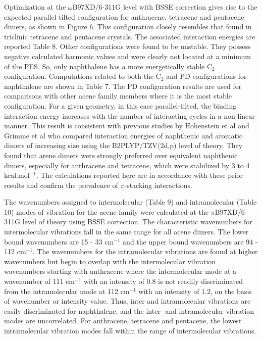 Optimization at the $\omega$B97XD/6-311G level with BSSE correction gives rise to the expected parallel tilted configuration \cite{brock1990temperature} for anthracene, tetracene and pentacene dimers, as shown in Figure 6. This configuration closely resembles that found in triclinic tetracene\cite{campbell1962crystal} and pentacene\cite{holmes1999nature} crystals. The associated interaction energies are reported Table 8.  Other configurations were found to be unstable. They possess negative calculated harmonic values and were clearly not located at a minimum of the PES. So, only naphthalene has a more energetically stable C$_{2}$ configuration. Computations related to both the C$_{2}$ and PD configurations for naphthalene are shown in Table 7. The PD configuration results are used for comparisons with other acene family members where it is the most stable configuration.
For a given geometry, in this case parallel-tilted, the binding interaction energy increases with the number of interacting cycles in a non-linear manner. This result is consistent with previous studies by Hohenstein et al \cite{hohenstein2010density} and Grimme et al\cite{grimme2008special} who compared interaction energies of naphthenic and aromatic dimers of increasing size using the B2PLYP/TZV(2d,p) level of theory. They found that arene dimers were strongly preferred over equivalent naphthenic dimers, especially for anthracene and tetracene, which were stabilized by 3 to 4 kcal.mol$^{-1}$. The calculations reported here are in accordance with these prior results and confirm the prevalence of $\pi$-stacking interactions.  

The wavenumbers assigned to intermolecular (Table 9) and intramolecular (Table 10) modes of vibration for the acene family were calculated at the $\pi$B97XD/6-311G level of theory using BSSE correction. The characteristic wavenumbers for intermolecular vibrations fall in the same range for all  acene dimers. The lower bound wavenumbers are 15 - 33 cm$^{-1}$ and the upper bound wavenumbers are 94 - 112 cm$^{-1}$. The wavenumbers for the intramolecular vibrations are found at higher wavenumbers but begin to overlap with the intermolecular vibration wavenumbers starting with anthracene where the intermolecular mode at a wavenumber of 111 cm$^{-1}$ with an intensity of 0.8 is not readily discriminated from the intramolecular mode at 112 cm$^{-1}$ with an intensity of 1.2, on the basis of wavenumber or intensity value. Thus, inter and intramolecular vibrations are easily discriminated for naphthalene, and the inter- and intramolecular vibration modes are uncorrelated. For anthracene, tetracene and pentacene, the lowest intramolecular vibration modes fall within the range of intermolecular vibrations. 

